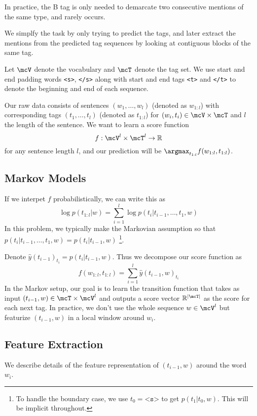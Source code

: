 \documentclass[11pt]{article}
\begin{document}
In practice, the B tag is only needed to demarcate two consecutive mentions of the same type, and rarely occurs. 

We simplfy the task by only trying to predict the tags, and later extract the mentions from the predicted tag sequences by looking at contiguous blocks of the same tag.

Let $\mcV$ denote the vocabulary and $\mcT$ denote the tag set. We use start and end padding words \texttt{<s>}, \texttt{</s>} along with start and end tags \texttt{<t>} and \texttt{</t>} to denote the beginning and end of each sequence.

 Our raw data consists of sentences $(w_1, \ldots, w_l)$ (denoted as $w_{1:l}$) with corresponding tags $(t_1, \ldots, t_l)$ (denoted as $t_{1:l}$) for $(w_i, t_i) \in \mcV \times \mcT$ and $l$ the length of the sentence. We want to learn a score function
$$f : \mcV^l \times \mcT^l \to \mathbb{R}$$
for any sentence length $l$, and our prediction will be $\argmax_{t_{1:l}} f(w_{1:l}, t_{1:l})$.

\subsection{Markov Models}

If we interpet $f$ probabilistically, we can write this as
$$\log p(t_{1:l} | w) = \sum_{i=1}^l \log p(t_i | t_{i-1}, \ldots, t_1, w) $$
In this problem, we typically make the Markovian assumption so that $p(t_i | t_{i-1}, \ldots, t_1, w) = p(t_i | t_{i-1}, w)$ \footnote{To handle the boundary case, we use $t_0 = \texttt{<s>}$ to get $p(t_1 | t_0, w)$. This will be implicit throughout.}.

Denote $\widehat{y}(t_{i-1})_{t_i} = p(t_i | t_{i-1}, w)$. Thus we decompose our score function as
$$f(w_{1:l}, t_{1:l}) = \sum_{i=1}^l \widehat{y}(t_{i-1}, w)_{t_i}$$
In the Markov setup, our goal is to learn the transition function that takes as input $(t_{i-1}, w) \in \mcT \times \mcV^l$ and outputs a score vector $\mathbb{R}^{|\mcT|}$ as the score for each next tag. In practice, we don't use the whole sequence $w \in \mcV^l$ but featurize $(t_{i-1}, w)$ in a local window around $w_i$.

\subsection{Feature Extraction}

We describe details of the feature representation of $(t_{i-1}, w)$ around the word $w_i$.
\end{document}

